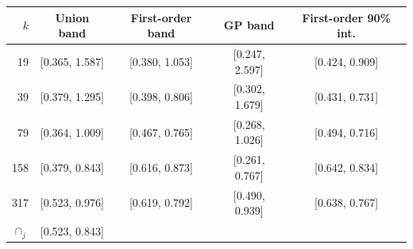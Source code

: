 \begin{tabular}{rcccc}
\toprule
$k$ & Union band & First-order band & GP band & First-order 90\% int.\\
\midrule
19 & [0.365, 1.587] & [0.380, 1.053] & [0.247, 2.597] & [0.424, 0.909]\\
39 & [0.379, 1.295] & [0.398, 0.806] & [0.302, 1.679] & [0.431, 0.731]\\
79 & [0.364, 1.009] & [0.467, 0.765] & [0.268, 1.026] & [0.494, 0.716]\\
158 & [0.379, 0.843] & [0.616, 0.873] & [0.261, 0.767] & [0.642, 0.834]\\
317 & [0.523, 0.976] & [0.619, 0.792] & [0.490, 0.939] & [0.638, 0.767]\\
\midrule
$\cap_j$ & [0.523, 0.843] & & & \\
\bottomrule
\end{tabular}
